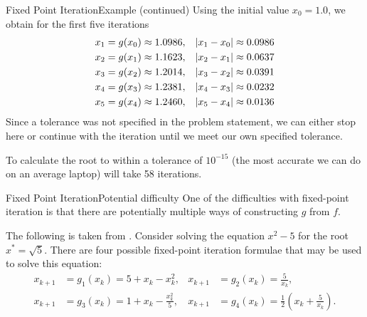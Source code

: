 \documentclass[12pt,aspectratio=169]{beamer}
\DeclarePairedDelimiter{\abs}{\lvert}{\rvert}
\begin{document}
\begin{frame}{Fixed Point Iteration}{Example (continued)}
  Using the initial value $x_0 = 1.0$, we obtain for the first five iterations
  \begin{align*}
    x_1 &= g(x_0) \approx 1.0986, &
    \abs{x_1 - x_0} &\approx 0.0986 \\
    x_2 &= g(x_1) \approx 1.1623, &
    \abs{x_2 - x_1} &\approx 0.0637 \\
    x_3 &= g(x_2) \approx 1.2014, &
    \abs{x_3 - x_2} &\approx 0.0391 \\
    x_4 &= g(x_3) \approx 1.2381, &
    \abs{x_4 - x_3} &\approx 0.0232 \\
    x_5 &= g(x_4) \approx 1.2460, &
    \abs{x_5 - x_4} &\approx 0.0136
  \end{align*}
  Since a tolerance was not specified in the problem statement, we can either
  stop here or continue with the iteration until we meet our own specified
  tolerance.

  To calculate the root to within a tolerance of $10^{-15}$ (the most accurate
  we can do on an average laptop) will take 58 iterations.
\end{frame}

\begin{frame}{Fixed Point Iteration}{Potential difficulty}
  One of the difficulties with fixed-point iteration is that there are
  potentially multiple ways of constructing $g$ from $f$.

  The following is taken from \cite[p.83]{atkinson1993elementary}.
  Consider solving the equation $x^2 - 5$ for the root $x^* = \sqrt{5}$.
  There are four possible fixed-point iteration formulae that may be used to
  solve this equation:
  \begin{align*}
    x_{k+1} &= g_1(x_k) = 5 + x_k - x_k^2, &
    x_{k+1} &= g_2(x_k) = \frac{5}{x_k}, \\
    x_{k+1} &= g_3(x_k) = 1 + x_k - \frac{x_k^2}{5}, &
    x_{k+1} &= g_4(x_k) = \frac{1}{2}\left(x_k + \frac{5}{x_k}\right).
  \end{align*}
\end{frame}
\end{document}
